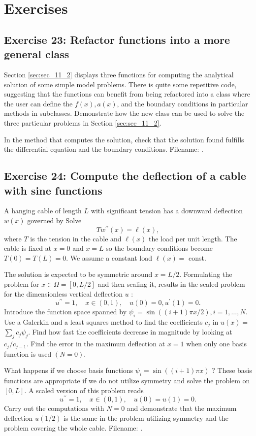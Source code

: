 \documentclass[../main.tex]{subfiles}
\begin{document}
\chapter{Exercises}
	\section*{Exercise 23: Refactor functions into a more general class}
		\label{sec:sec_21_23}
		Section \ref{sec:sec_11_2} displays three functions for computing the analytical solution of some simple model problems. There is quite some repetitive code, suggesting that the functions can benefit from being refactored into a class where the user can define the $f(x), a(x)$, and the boundary conditions in particular methods in subclasses. Demonstrate how the new class can be used to solve the three particular problems in Section \ref{sec:sec_11_2}.
		
		In the method that computes the solution, check that the solution found fulfills the differential equation and the boundary conditions. 
		Filename: .\bigbreak
	\section*{Exercise 24: Compute the deflection of a cable with sine functions}
		\label{sec:sec_21_24}
		\noindent A hanging cable of length $L$ with significant tension has a downward deflection $w(x)$ governed by
		Solve
		$$
		T w^{\prime \prime}(x)=\ell(x),
		$$
		where $T$ is the tension in the cable and $\ell(x)$ the load per unit length. The cable is fixed at $x=0$ and $x=L$ so the boundary conditions become $T(0)=T(L)=0$. We assume a constant load $\ell(x)=$ const.
		
		The solution is expected to be symmetric around $x=L / 2$. Formulating the problem for $x \in \Omega=[0, L / 2]$ and then scaling it, results in the scaled problem for the dimensionless vertical deflection $u$ :
		$$
		u^{\prime \prime}=1, \quad x \in(0,1), \quad u(0)=0, u^{\prime}(1)=0 .
		$$
		Introduce the function space spanned by $\psi_{i}=\sin ((i+1) \pi x / 2), i=1, \ldots, N$. Use a Galerkin and a least squares method to find the coefficients $c_{j}$ in $u(x)=$ $\sum_{j} c_{j} \psi_{j}$. Find how fast the coefficients decrease in magnitude by looking at $c_{j} / c_{j-1}$. Find the error in the maximum deflection at $x=1$ when only one basis function is used $(N=0)$.
		
		What happens if we choose basis functions $\psi_{i}=\sin ((i+1) \pi x)$ ? These basis functions are appropriate if we do not utilize symmetry and solve the problem on $[0, L]$. A scaled version of this problem reads
		$$
		u^{\prime \prime}=1, \quad x \in(0,1), \quad u(0)=u(1)=0 .
		$$
		Carry out the computations with $N=0$ and demonstrate that the maximum deflection $u(1 / 2)$ is the same in the problem utilizing symmetry and the problem covering the whole cable.
		Filename: . \bigbreak
\end{document}
